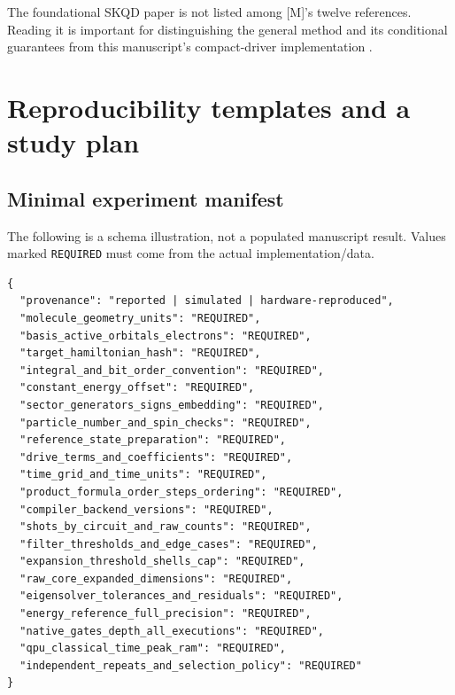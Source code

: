 \documentclass[11pt,a4paper,oneside]{report}
\begin{document}
The foundational SKQD paper is not listed among [M]'s twelve references. Reading it is important for distinguishing the general method and its conditional guarantees from this manuscript's compact-driver implementation \cite{yu}.

\chapter{Reproducibility templates and a study plan}
\section{Minimal experiment manifest}
The following is a schema illustration, not a populated manuscript result. Values marked \texttt{REQUIRED} must come from the actual implementation/data.
\begin{lstlisting}
{
  "provenance": "reported | simulated | hardware-reproduced",
  "molecule_geometry_units": "REQUIRED",
  "basis_active_orbitals_electrons": "REQUIRED",
  "target_hamiltonian_hash": "REQUIRED",
  "integral_and_bit_order_convention": "REQUIRED",
  "constant_energy_offset": "REQUIRED",
  "sector_generators_signs_embedding": "REQUIRED",
  "particle_number_and_spin_checks": "REQUIRED",
  "reference_state_preparation": "REQUIRED",
  "drive_terms_and_coefficients": "REQUIRED",
  "time_grid_and_time_units": "REQUIRED",
  "product_formula_order_steps_ordering": "REQUIRED",
  "compiler_backend_versions": "REQUIRED",
  "shots_by_circuit_and_raw_counts": "REQUIRED",
  "filter_thresholds_and_edge_cases": "REQUIRED",
  "expansion_threshold_shells_cap": "REQUIRED",
  "raw_core_expanded_dimensions": "REQUIRED",
  "eigensolver_tolerances_and_residuals": "REQUIRED",
  "energy_reference_full_precision": "REQUIRED",
  "native_gates_depth_all_executions": "REQUIRED",
  "qpu_classical_time_peak_ram": "REQUIRED",
  "independent_repeats_and_selection_policy": "REQUIRED"
}
\end{lstlisting}
\end{document}
